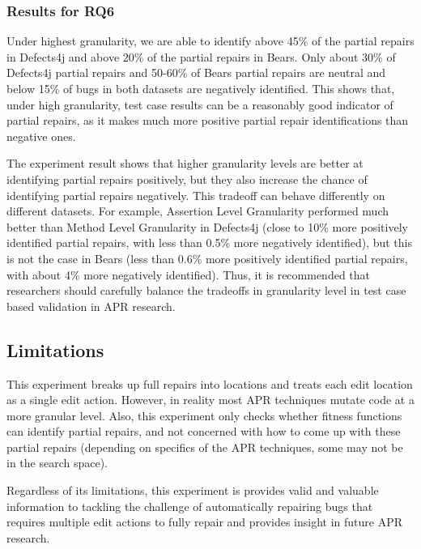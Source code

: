 \documentclass[sigconf, timestamp-false, anonymous=true]{acmart}
\begin{document}
\subsubsection{Results for RQ6}

Under highest granularity, we are able to identify above 45\% of the partial repairs in Defects4j
and above 20\% of the partial repairs in Bears. Only about 30\% of Defects4j partial repairs and 50-60\%
of Bears partial repairs are neutral and below 15\% of bugs in both datasets are negatively identified. This shows that, 
under high granularity, test case results can be a reasonably good indicator of partial repairs, as it makes much
more positive partial repair identifications than negative ones.
 
The experiment result shows that higher granularity levels are better at identifying partial repairs positively, 
but they also increase the chance of identifying partial repairs negatively.
This tradeoff can behave differently on different datasets. For example,
Assertion Level Granularity performed much better than Method Level Granularity
in Defects4j (close to 10\% more positively identified partial repairs, with less than
0.5\% more negatively identified), but this is not the case in Bears (less than 0.6\%
more positively identified partial repairs, with about 4\% more negatively identified).
Thus, it is recommended that researchers should 
carefully balance the tradeoffs in granularity level in test case based validation
in APR research.


\subsection{Limitations}

This experiment breaks up full repairs into locations and treats each edit location as a 
single edit action. However, in reality most APR techniques mutate code at 
a more granular level.
Also, this experiment only checks whether fitness functions 
can identify partial repairs, and not concerned with how to come up with these 
partial repairs (depending on specifics of the APR 
techniques, some may not be in the search space).

Regardless of its limitations, this experiment is provides valid and valuable 
information to tackling the challenge of automatically repairing bugs that 
requires multiple edit actions to fully repair 
and provides insight in future APR research.
\end{document}
